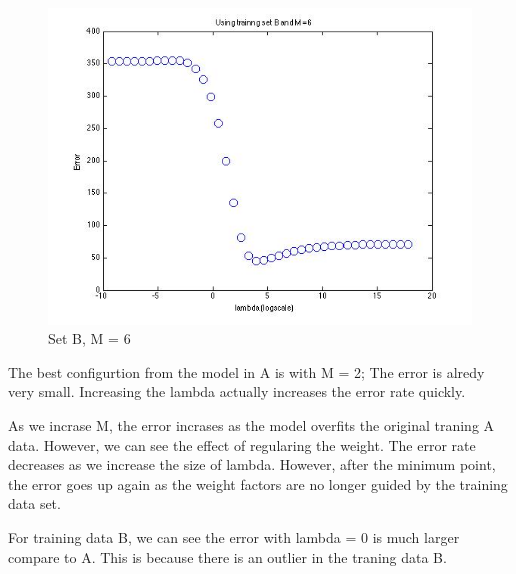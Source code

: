 \begin{figure}[!htb]
  \includegraphics[width=\linewidth]{figures/p3_regressB_m=6}
  \caption{Set B, M = 6}\label{fig:p3_regressB_m=6}
\endminipage
\end{figure}


The best configurtion from the model in A is with M = 2; The error is alredy very small. Increasing
the lambda actually increases the error rate quickly. 

As we incrase M, the error incrases as the model overfits the original traning A data. However, we 
can see the effect of regularing the weight. The error rate decreases as we increase the size of lambda. However, after the minimum point, the error goes up again as the weight factors are no longer guided by the training data set. 

For training data B, we can see the error with lambda = 0 is much larger compare to A. This is because there is an outlier in the traning data B. 


